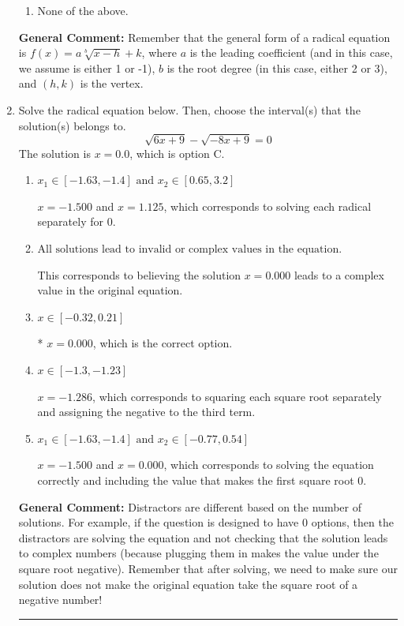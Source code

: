 \documentclass{extbook}[14pt]
\newcommand{\litem}[1]{\item #1

\rule{\textwidth}{0.4pt}}
\begin{document}
\begin{enumerate}
{\begin{enumerate}[label=\Alph*.]
\item None of the above.\end{enumerate}
\textbf{General Comment:} Remember that the general form of a radical equation is $ f(x) = a \sqrt[b]{x - h} + k $, where $a$ is the leading coefficient (and in this case, we assume is either 1 or -1), $b$ is the root degree (in this case, either 2 or 3), and $(h, k)$ is the vertex.
}
\litem{
Solve the radical equation below. Then, choose the interval(s) that the solution(s) belongs to.
\[ \sqrt{6 x + 9} - \sqrt{-8 x + 9} = 0 \]The solution is \( x = 0.0 \), which is option C.\begin{enumerate}[label=\Alph*.]
\item \( x_1 \in [-1.63, -1.4] \text{ and } x_2 \in [0.65,3.2] \)

$x = -1.500$ and $x = 1.125$, which corresponds to solving each radical separately for 0.
\item \( \text{All solutions lead to invalid or complex values in the equation.} \)

This corresponds to believing the solution $x = 0.000$ leads to a complex value in the original equation.
\item \( x \in [-0.32,0.21] \)

* $x = 0.000$, which is the correct option.
\item \( x \in [-1.3,-1.23] \)

$x = -1.286$, which corresponds to squaring each square root separately and assigning the negative to the third term.
\item \( x_1 \in [-1.63, -1.4] \text{ and } x_2 \in [-0.77,0.54] \)

$x = -1.500$ and $x = 0.000$, which corresponds to solving the equation correctly and including the value that makes the first square root 0.
\end{enumerate}

\textbf{General Comment:} Distractors are different based on the number of solutions. For example, if the question is designed to have 0 options, then the distractors are solving the equation and not checking that the solution leads to complex numbers (because plugging them in makes the value under the square root negative). Remember that after solving, we need to make sure our solution does not make the original equation take the square root of a negative number!
}
\end{enumerate}
\end{document}
